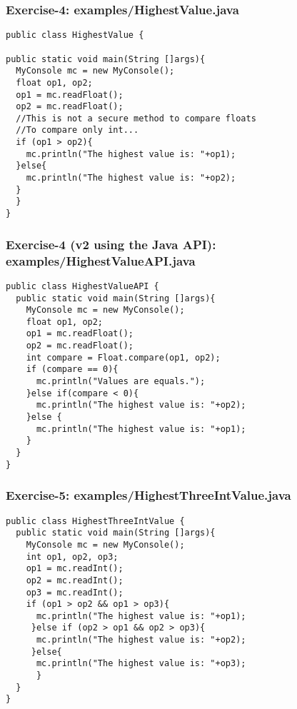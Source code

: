 \documentclass[xcolor=dvipsnames,dvip,notes=show,handout,table]{beamer}
\begin{document}
\begin{frame}[fragile]
\frametitle{Exercise-4: examples/HighestValue.java}
\scriptsize
\begin{lstlisting}
public class HighestValue {

public static void main(String []args){
  MyConsole mc = new MyConsole();
  float op1, op2;
  op1 = mc.readFloat();
  op2 = mc.readFloat();
  //This is not a secure method to compare floats
  //To compare only int...
  if (op1 > op2){
    mc.println("The highest value is: "+op1);	
  }else{
    mc.println("The highest value is: "+op2);
  }
  }
}
\end{lstlisting}
\end{frame}

\begin{frame}[fragile]
\frametitle{Exercise-4 (v2 using the Java API): examples/HighestValueAPI.java}
\scriptsize
\begin{lstlisting}
public class HighestValueAPI {
  public static void main(String []args){
    MyConsole mc = new MyConsole();
    float op1, op2;
    op1 = mc.readFloat();
    op2 = mc.readFloat();
    int compare = Float.compare(op1, op2); 
    if (compare == 0){
      mc.println("Values are equals.");	
    }else if(compare < 0){
      mc.println("The highest value is: "+op2);
    }else {
      mc.println("The highest value is: "+op1);
    }
  }
}
\end{lstlisting}
\end{frame}




\begin{frame}[fragile]
\frametitle{Exercise-5: examples/HighestThreeIntValue.java}
\scriptsize
\begin{lstlisting}
public class HighestThreeIntValue {
  public static void main(String []args){
    MyConsole mc = new MyConsole();
    int op1, op2, op3;
    op1 = mc.readInt();
    op2 = mc.readInt();
    op3 = mc.readInt();
    if (op1 > op2 && op1 > op3){
      mc.println("The highest value is: "+op1);
     }else if (op2 > op1 && op2 > op3){
      mc.println("The highest value is: "+op2);
     }else{
      mc.println("The highest value is: "+op3);
      }
  }
}
\end{lstlisting}
\end{frame}
\end{document}
